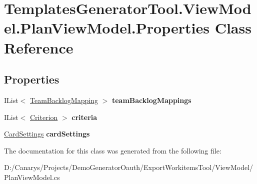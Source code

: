 \hypertarget{class_templates_generator_tool_1_1_view_model_1_1_plan_view_model_1_1_properties}{}\section{Templates\+Generator\+Tool.\+View\+Model.\+Plan\+View\+Model.\+Properties Class Reference}
\label{class_templates_generator_tool_1_1_view_model_1_1_plan_view_model_1_1_properties}
\subsection*{Properties}
\begin{DoxyCompactItemize}
\item 
\mbox{\label{class_templates_generator_tool_1_1_view_model_1_1_plan_view_model_1_1_properties_a76fdfe1ed76e610e854663bedb6dcc33}} 
I\+List$<$ \mbox{\hyperlink{class_templates_generator_tool_1_1_view_model_1_1_plan_view_model_1_1_team_backlog_mapping}{Team\+Backlog\+Mapping}} $>$ {\bfseries team\+Backlog\+Mappings}
\item 
\mbox{\label{class_templates_generator_tool_1_1_view_model_1_1_plan_view_model_1_1_properties_ab040b6d1b4661a1b755265c88372d6c7}} 
I\+List$<$ \mbox{\hyperlink{class_templates_generator_tool_1_1_view_model_1_1_plan_view_model_1_1_criterion}{Criterion}} $>$ {\bfseries criteria}
\item 
\mbox{\label{class_templates_generator_tool_1_1_view_model_1_1_plan_view_model_1_1_properties_a52ca7c5cb3dabb325b8f143a689ad5ee}} 
\mbox{\hyperlink{class_templates_generator_tool_1_1_view_model_1_1_plan_view_model_1_1_card_settings}{Card\+Settings}} {\bfseries card\+Settings}
\end{DoxyCompactItemize}


The documentation for this class was generated from the following file\+:\begin{DoxyCompactItemize}
\item 
D\+:/\+Canarys/\+Projects/\+Demo\+Generator\+Oauth/\+Export\+Workitems\+Tool/\+View\+Model/Plan\+View\+Model.\+cs\end{DoxyCompactItemize}
